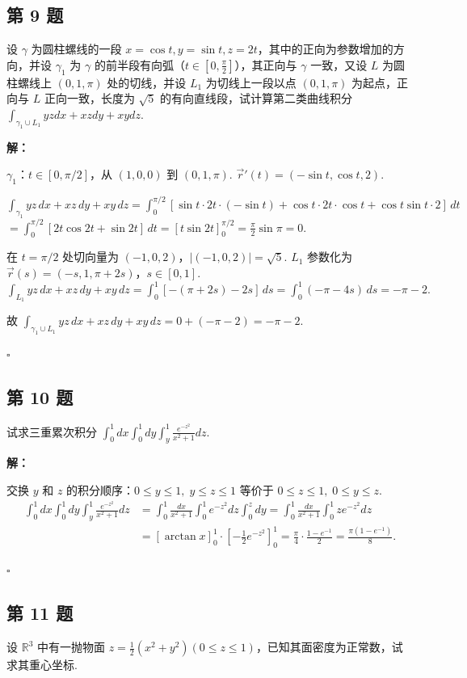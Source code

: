 \documentclass[12pt,a4paper]{article}
\newenvironment{sol}[1][解]{%
  \par\medskip\noindent\textbf{#1：}\itshape\par\noindent\ignorespaces
}{%
  \par\hfill$\square$\par\medskip
}
\begin{document}
\subsection*{第 9 题}
设 $\gamma$ 为圆柱螺线的一段 $x=\cos t, y=\sin t, z=2t$，其中的正向为参数增加的方向，并设
$\gamma_1$ 为 $\gamma$ 的前半段有向弧（$t\in[0,\frac{\pi}{2}]$），其正向与 $\gamma$
一致，又设 $L$ 为圆柱螺线上 $(0,1,\pi)$ 处的切线，并设 $L_1$ 为切线上一段以点 $(0,1,\pi)$
为起点，正向与 $L$ 正向一致，长度为 $\sqrt{5}$ 的有向直线段，试计算第二类曲线积分 $\int_{\gamma_1\cup
L_1}yzdx+xzdy+xydz$.

\begin{sol}$\gamma_1$：$t\in[0,\pi/2]$，从 $(1,0,0)$ 到 $(0,1,\pi)$.
  $\vec{r}'(t)=(-\sin t,\cos t,2)$.

  $\int_{\gamma_1}yz\,dx+xz\,dy+xy\,dz=\int_0^{\pi/2}[\sin t\cdot
  2t\cdot(-\sin t)+\cos t\cdot 2t\cdot\cos t+\cos t\sin t\cdot 2]\,dt$
  $=\int_0^{\pi/2}[2t\cos 2t+\sin 2t]\,dt=[t\sin
  2t]_0^{\pi/2}=\frac{\pi}{2}\sin\pi=0.$

  在 $t=\pi/2$ 处切向量为 $(-1,0,2)$，$|(-1,0,2)|=\sqrt{5}$. $L_1$ 参数化为
  $\vec{r}(s)=(-s,1,\pi+2s)$，$s\in[0,1]$.
  $\int_{L_1}yz\,dx+xz\,dy+xy\,dz=\int_0^1[-(\pi+2s)-2s]\,ds=\int_0^1(-\pi-4s)\,ds=-\pi-2.$

  故 $\int_{\gamma_1\cup L_1}yz\,dx+xz\,dy+xy\,dz=0+(-\pi-2)=-\pi-2.$

\end{sol}
\subsection*{第 10 题}
试求三重累次积分 $\int_{0}^{1}dx\int_{0}^{1}dy\int_{y}^{1}\frac{e^{-z^2}}{x^2+1}dz$.

\begin{sol}交换 $y$ 和 $z$ 的积分顺序：$0\le y\le 1,\; y\le z\le 1$ 等价于 $0\le
  z\le 1,\; 0\le y\le z$.
  \begin{align*}
    \int_0^1 dx\int_0^1 dy\int_y^1\frac{e^{-z^2}}{x^2+1}dz
    &=\int_0^1\frac{dx}{x^2+1}\int_0^1 e^{-z^2}dz\int_0^z dy
    =\int_0^1\frac{dx}{x^2+1}\int_0^1 ze^{-z^2}dz\\
    &=\left[\arctan x\right]_0^1\cdot\left[-\frac{1}{2}e^{-z^2}\right]_0^1
    =\frac{\pi}{4}\cdot\frac{1-e^{-1}}{2}=\frac{\pi(1-e^{-1})}{8}.
  \end{align*}

\end{sol}
\subsection*{第 11 题}
设 $\mathbb{R}^3$ 中有一抛物面 $z=\frac{1}{2}(x^2+y^2) (0\le z\le
1)$，已知其面密度为正常数，试求其重心坐标.
\end{document}

